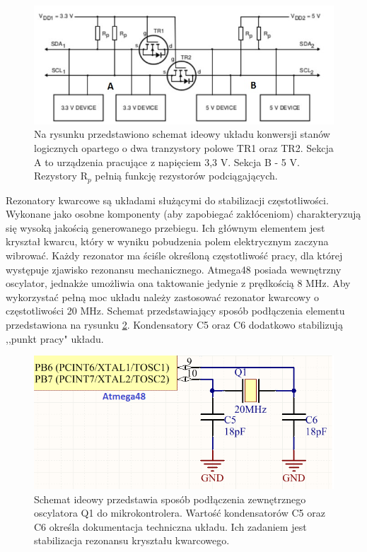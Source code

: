\begin{figure}[H]
    \begin{center}
      \includegraphics[scale=0.40]{imgs/konwersja.jpg}
 	\caption[Konwersja stanów logicznych.]{\small{Na rysunku przedstawiono schemat ideowy układu konwersji stanów logicznych opartego o dwa tranzystory polowe TR1 oraz TR2. Sekcja A to urządzenia pracujące z napięciem 3,3 V. Sekcja B - 5 V. Rezystory R$_p$ pełnią funkcję rezystorów podciągających.}\footnotemark}
	\label{konw_sch}
    \end{center}
  \end{figure}  
  	  
  Rezonatory kwarcowe są układami służącymi do stabilizacji częstotliwości. Wykonane jako osobne komponenty (aby zapobiegać zakłóceniom) charakteryzują się wysoką jakością generowanego przebiegu. Ich głównym elementem jest kryształ kwarcu, który w wyniku pobudzenia polem elektrycznym zaczyna wibrować. Każdy rezonator ma ściśle określoną częstotliwość pracy, dla której występuje zjawisko rezonansu mechanicznego.  Atmega48 posiada wewnętrzny oscylator, jednakże umożliwia ona taktowanie jedynie z prędkością 8 MHz. Aby wykorzystać pełną moc układu należy zastosować rezonator kwarcowy o częstotliwości 20 MHz. Schemat przedstawiający sposób podłączenia elementu przedstawiona na rysunku \ref{xxtal}. Kondensatory C5 oraz C6 dodatkowo stabilizują ,,punkt pracy" układu. 
  
   \begin{figure}[H]
    \begin{center}
      \includegraphics[scale=0.45]{imgs/xtal.png}
 	\caption[Podłączenie rezonatora kwarcowego.]{\small{Schemat ideowy przedstawia sposób podłączenia zewnętrznego oscylatora Q1 do mikrokontrolera. Wartość kondensatorów C5 oraz C6 określa dokumentacja techniczna układu. Ich zadaniem jest stabilizacja rezonansu kryształu kwarcowego. }}
	\label{xxtal}
    \end{center}
  \end{figure}   
  